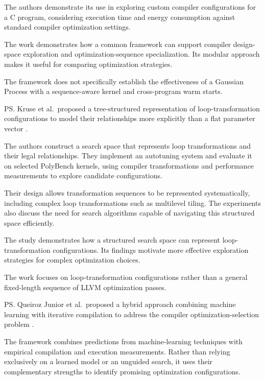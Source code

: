 The authors demonstrate its use in exploring custom compiler configurations for a C program, considering execution time and energy consumption against standard compiler optimization settings.

\re{} The work demonstrates how a common framework can support compiler design-space exploration and optimization-sequence specialization. Its modular approach makes it useful for comparing optimization strategies.

\rg{} The framework does not specifically establish the effectiveness of a Gaussian Process with a sequence-aware kernel and cross-program warm starts.

\ps{} Kruse et al.\ proposed a tree-structured representation of loop-transformation configurations to model their relationships more explicitly than a flat parameter vector \cite{kruse2020autotuning}.

\me{} The authors construct a search space that represents loop transformations and their legal relationships. They implement an autotuning system and evaluate it on selected PolyBench kernels, using compiler transformations and performance measurements to explore candidate configurations.

Their design allows transformation sequences to be represented systematically, including complex loop transformations such as multilevel tiling. The experiments also discuss the need for search algorithms capable of navigating this structured space efficiently.

\re{} The study demonstrates how a structured search space can represent loop-transformation configurations. Its findings motivate more effective exploration strategies for complex optimization choices.

\rg{} The work focuses on loop-transformation configurations rather than a general fixed-length sequence of LLVM optimization passes.

\ps{} Queiroz Junior et al.\ proposed a hybrid approach combining machine learning with iterative compilation to address the compiler optimization-selection problem \cite{queiroz2020hybrid}.

\me{} The framework combines predictions from machine-learning techniques with empirical compilation and execution measurements. Rather than relying exclusively on a learned model or an unguided search, it uses their complementary strengths to identify promising optimization configurations.

